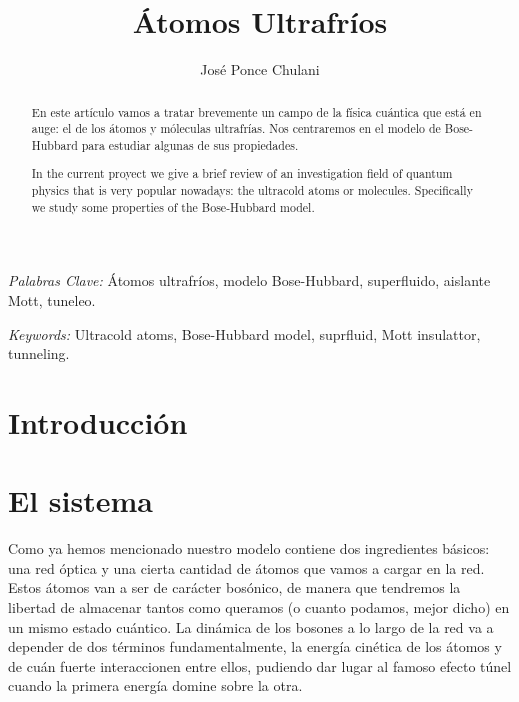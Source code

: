\documentclass[11pt,a4paper]{article}
\begin{document}
\title{\'Atomos Ultrafr\'ios}
\author{Jos\'e Ponce Chulani}

\maketitle


\bigskip

\begin{abstract}
  En este artículo vamos a tratar brevemente un campo de la física cuántica que está en auge: el de los \'atomos y m\'oleculas ultrafr\'ias. Nos centraremos en el modelo de Bose-Hubbard para estudiar algunas de sus propiedades.
\end{abstract}

\bigskip

\textit{Palabras Clave:}
Átomos ultrafríos, modelo Bose-Hubbard, superfluido, aislante Mott, tuneleo.

 

\begin{abstract}
  In the current proyect we give a brief review of an investigation field of quantum physics that is very popular nowadays: the ultracold atoms or molecules. Specifically we study some properties of the Bose-Hubbard model. 
\end{abstract}

\bigskip

\textit{Keywords:}
Ultracold atoms, Bose-Hubbard model, suprfluid, Mott insulattor, tunneling.



\section{Introducción}


\section{El sistema}

Como ya hemos mencionado nuestro modelo contiene dos ingredientes básicos: una red óptica y una cierta cantidad de átomos que vamos a cargar en la red. Estos átomos van a ser de carácter bosónico, de manera que tendremos la libertad de almacenar tantos como queramos (o cuanto podamos, mejor dicho) en un mismo estado cuántico. La dinámica de los bosones a lo largo de la red va a depender de dos términos fundamentalmente, la energía cinética de los átomos y de cuán fuerte interaccionen entre ellos, pudiendo dar lugar al famoso efecto túnel cuando la primera energía domine sobre la otra.
\end{document}

